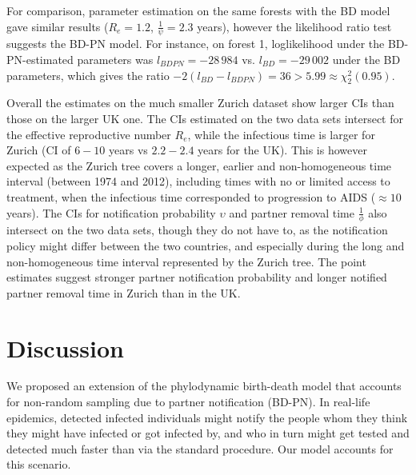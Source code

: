 \documentclass[10pt,letterpaper]{article}
\begin{document}
For comparison, parameter estimation on the same forests with the BD model gave similar results ($R_e = 1.2$, $\frac{1}{\psi} = 2.3$ years), however the likelihood ratio test suggests the BD-PN model. For instance, on forest 1, loglikelihood under the BD-PN-estimated parameters was $l_{BDPN} = -28\,984$ vs. $l_{BD}=-29\,002$ under the BD parameters, which gives the ratio $-2 (l_{BD} - l_{BDPN}) =	36 > 5.99 \approx \chi^2_2(0.95)$. %

\bigskip

Overall the estimates on the much smaller Zurich dataset show larger CIs than those on the larger UK one. The CIs estimated on the two data sets intersect for the effective reproductive number $R_e$, while the infectious time is larger for Zurich (CI of $6-10$ years vs $2.2-2.4$ years for the UK). This is however expected as the Zurich tree covers a longer, earlier and non-homogeneous time interval (between 1974 and 2012), including times with no or limited access to treatment, when the infectious time corresponded to progression to AIDS ($\approx 10$ years). The CIs for notification probability $\upsilon$ and partner removal time $\frac{1}{\phi}$ also intersect on the two data sets, though they do not have to, as the notification policy might differ between the two countries, and especially during the long and non-homogeneous time interval represented by the Zurich tree. The point estimates suggest stronger partner notification probability and longer notified partner removal time in Zurich than in the UK.




\section*{Discussion}
We proposed an extension of the phylodynamic birth-death model that accounts for non-random sampling due to partner notification (BD-PN). In real-life epidemics, detected infected individuals might notify the people whom they think they might have infected or got infected by, and who in turn might get tested and detected much faster than via the standard procedure. Our model accounts for this scenario.
\end{document}
